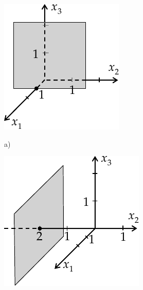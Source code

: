 \documentclass{ajc}
\numberwithin{equation}{subsection}
\begin{document}
	\begin{figure}[ht]
		\centering
		\begin{minipage}[b]{0.2\textwidth}
			\includegraphics[width=\textwidth]{ma_008_flache1.pdf}
			\label{fig:008_flache1}
			\begin{center}
				a)
			\end{center}
		\end{minipage}
		\hfill
		\begin{minipage}[b]{0.2\textwidth}
			\includegraphics[width=\textwidth]{ma_009_flache2.pdf}

\end{minipage}
\end{figure}
\end{document}
